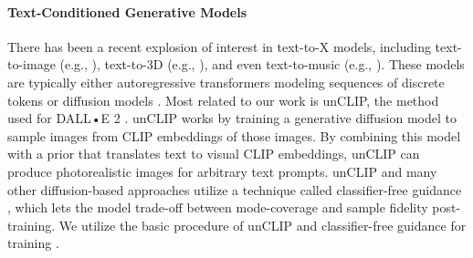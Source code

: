 \paragraph{Text-Conditioned Generative Models}
There has been a recent explosion of interest in text-to-X models, including text-to-image (e.g., \citep{ramesh2022dalle2, imagen, rombach2022ldm}), text-to-3D (e.g., \citep{shapee, lin2023magic3d}), and even text-to-music (e.g., \citep{musiclm}). These models are typically either autoregressive transformers modeling sequences of discrete tokens \citep{transformer, brown2020language} or diffusion models \citep{diffusion}. Most related to our work is unCLIP, the method used for DALL•E 2 \citep{ramesh2022dalle2}. unCLIP works by training a generative diffusion model to sample images from CLIP \citep{radford2021clip} embeddings of those images. By combining this model with a prior that translates text to visual CLIP embeddings, unCLIP can produce photorealistic images for arbitrary text prompts. unCLIP and many other diffusion-based approaches utilize a technique called classifier-free guidance \citep{cfg}, which lets the model trade-off between mode-coverage and sample fidelity post-training. We utilize the basic procedure of unCLIP and classifier-free guidance for training \agentname{}.